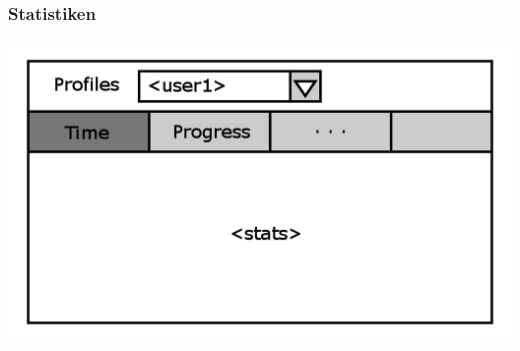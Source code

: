 \documentclass[t]{beamer}
\begin{document}
\begin{frame}
	\frametitle{Statistiken}
	\includegraphics[height=\textheight]{stats.png}
\end{frame}
\end{document}
